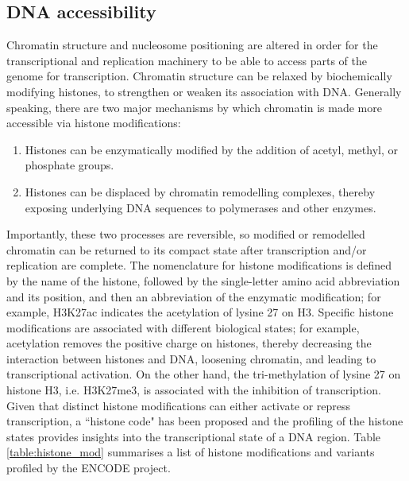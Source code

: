 \subsection{DNA accessibility}

Chromatin structure and nucleosome positioning are altered in order for the transcriptional and replication machinery to be able to access parts of the genome for transcription. Chromatin structure can be relaxed by biochemically modifying histones, to strengthen or weaken its association with DNA. Generally speaking, there are two major mechanisms by which chromatin is made more accessible via histone modifications:

\begin{enumerate}
   \item Histones can be enzymatically modified by the addition of acetyl, methyl, or phosphate groups.
   \item Histones can be displaced by chromatin remodelling complexes, thereby exposing underlying DNA sequences to polymerases and other enzymes.
\end{enumerate}

Importantly, these two processes are reversible, so modified or remodelled chromatin can be returned to its compact state after transcription and/or replication are complete. The nomenclature for histone modifications is defined by the name of the histone, followed by the single-letter amino acid abbreviation and its position, and then an abbreviation of the enzymatic modification; for example, H3K27ac indicates the acetylation of lysine 27 on H3. Specific histone modifications are associated with different biological states; for example, acetylation removes the positive charge on histones, thereby decreasing the interaction between histones and DNA, loosening chromatin, and leading to transcriptional activation. On the other hand, the tri-methylation of lysine 27 on histone H3, i.e. H3K27me3, is associated with the inhibition of transcription\cite{pmid21652639}. Given that distinct histone modifications can either activate or repress transcription, a ``histone code" has been proposed\cite{pmid11498575} and the profiling of the histone states provides insights into the transcriptional state of a DNA region. Table \ref{table:histone_mod} summarises a list of histone modifications and variants profiled by the ENCODE project\cite{pmid22955616}.

